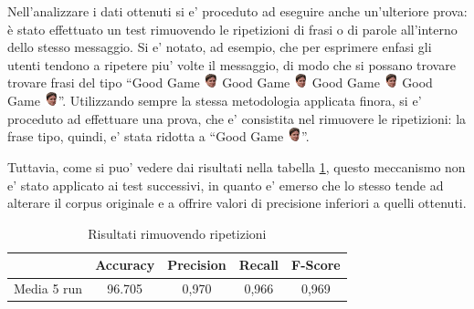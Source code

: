 \documentclass[a4paper,12pt,openright,twoside]{report}
\theoremstyle{definition}
\begin{document}
Nell'analizzare i dati ottenuti si e' proceduto ad eseguire anche un'ulteriore prova:
è stato effettuato un test rimuovendo le ripetizioni di frasi o di parole all'interno dello stesso messaggio.
Si e' notato, ad esempio, che per esprimere enfasi gli utenti tendono a ripetere piu' volte il messaggio,
di modo che si possano trovare
trovare frasi del tipo ``Good Game \includegraphics[height=0.4cm, width=0.4cm]{Immagini/Emoticons/kappahd.png}
Good Game \includegraphics[height=0.4cm, width=0.4cm]{Immagini/Emoticons/kappahd.png} Good Game
\includegraphics[height=0.4cm, width=0.4cm]{Immagini/Emoticons/kappahd.png} Good Game \includegraphics[height=0.4cm, width=0.4cm]{Immagini/Emoticons/kappahd.png}''.
Utilizzando sempre la stessa metodologia applicata finora, 
si e' proceduto ad effettuare una prova, che e' consistita nel rimuovere le ripetizioni:
la frase tipo, quindi, e' stata ridotta a ``Good Game \includegraphics[height=0.4cm, width=0.4cm]{Immagini/Emoticons/kappahd.png}''.

Tuttavia, come si puo' vedere dai risultati nella tabella \ref{tab:analisiCongiunteNoRip},
questo meccanismo non e' stato applicato ai test successivi, in quanto
e' emerso che lo stesso tende ad alterare il corpus originale e a offrire
valori di precisione inferiori a quelli ottenuti.

\begin{table}[H]
\begin{center}
\begin{tabular}{|c|c|c|c|c|}
\hline
 & Accuracy & Precision & Recall & F-Score\\
\hline
Media 5 run & 96.705 &  0,970 & 0,966 & 0,969 \\
\hline
\end{tabular}
\end{center}
\caption{Risultati rimuovendo ripetizioni}
\label{tab:analisiCongiunteNoRip}
\end{table}
\end{document}
